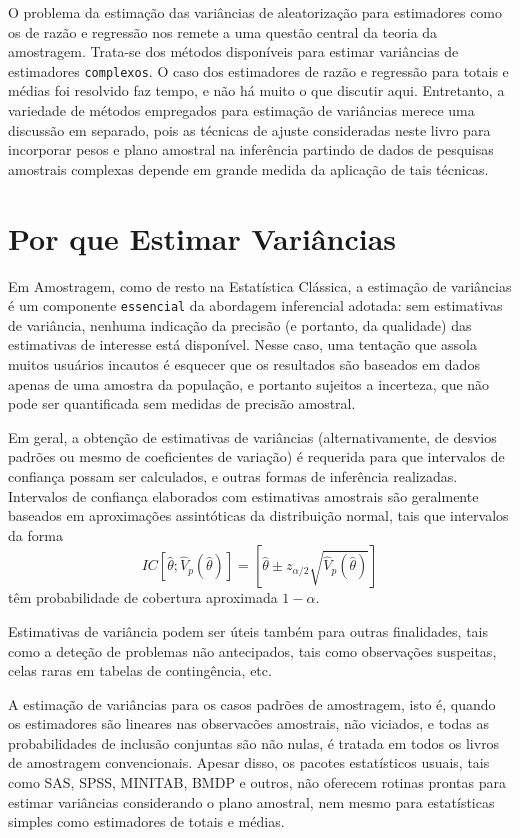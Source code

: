 \documentclass[]{book}
\numberwithin{example}{chapter}
\numberwithin{remark}{chapter}
\numberwithin{definition}{chapter}
\begin{document}
O problema da estimação das variâncias de aleatorização para estimadores
como os de razão e regressão nos remete a uma questão central da teoria
da amostragem. Trata-se dos métodos disponíveis para estimar variâncias
de estimadores \texttt{complexos}. O caso dos estimadores de razão e
regressão para totais e médias foi resolvido faz tempo, e não há muito o
que discutir aqui. Entretanto, a variedade de métodos empregados para
estimação de variâncias merece uma discussão em separado, pois as
técnicas de ajuste consideradas neste livro para incorporar pesos e
plano amostral na inferência partindo de dados de pesquisas amostrais
complexas depende em grande medida da aplicação de tais técnicas.

\section{Por que Estimar Variâncias}\label{por-que-estimar-variancias}

Em Amostragem, como de resto na Estatística Clássica, a estimação de
variâncias é um componente \texttt{essencial} da abordagem inferencial
adotada: sem estimativas de variância, nenhuma indicação da precisão (e
portanto, da qualidade) das estimativas de interesse está disponível.
Nesse caso, uma tentação que assola muitos usuários incautos é esquecer
que os resultados são baseados em dados apenas de uma amostra da
população, e portanto sujeitos a incerteza, que não pode ser
quantificada sem medidas de precisão amostral.

Em geral, a obtenção de estimativas de variâncias (alternativamente, de
desvios padrões ou mesmo de coeficientes de variação) é requerida para
que intervalos de confiança possam ser calculados, e outras formas de
inferência realizadas. Intervalos de confiança elaborados com
estimativas amostrais são geralmente baseados em aproximações
assintóticas da distribuição normal, tais que intervalos da forma \[
IC\left[ \widehat{\theta };\widehat{V}_{p}\left( \widehat{\theta }\right)
\right] =\left[ \widehat{\theta }\pm z_{\alpha /2}\sqrt{\widehat{V}%
_{p}\left( \widehat{\theta }\right) }\right] 
\] têm probabilidade de cobertura aproximada \(1-\alpha\).

Estimativas de variância podem ser úteis também para outras finalidades,
tais como a deteção de problemas não antecipados, tais como observações
suspeitas, celas raras em tabelas de contingência, etc.

A estimação de variâncias para os casos padrões de amostragem, isto é,
quando os estimadores são lineares nas observacões amostrais, não
viciados, e todas as probabilidades de inclusão conjuntas são não nulas,
é tratada em todos os livros de amostragem convencionais. Apesar disso,
os pacotes estatísticos usuais, tais como SAS, SPSS, MINITAB, BMDP e
outros, não oferecem rotinas prontas para estimar variâncias
considerando o plano amostral, nem mesmo para estatísticas simples como
estimadores de totais e médias.
\end{document}
